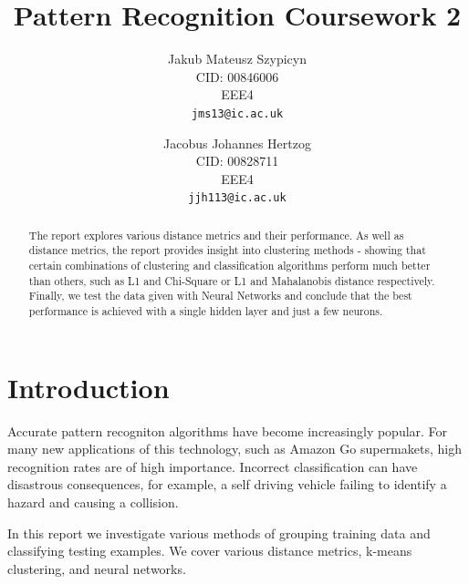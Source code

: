 \documentclass[10pt,twocolumn,letterpaper]{article}
\begin{document}
\title{Pattern Recognition Coursework 2}

\author{Jakub Mateusz Szypicyn\\
CID: 00846006\\
EEE4\\
{\tt\small jms13@ic.ac.uk}
\and
Jacobus Johannes Hertzog\\
CID: 00828711\\
EEE4\\
{\tt\small jjh113@ic.ac.uk}
}

\maketitle

\begin{abstract}
The report explores various distance metrics and their performance. As well as distance metrics, the report provides insight into clustering methods - showing that certain combinations of clustering and classification algorithms perform much better than others, such as L1 and Chi-Square or L1 and Mahalanobis distance respectively. Finally, we test the data given with Neural Networks and conclude that the best performance is achieved with a single hidden layer and just a few neurons.

\end{abstract}
\vspace{-8mm}
\section{Introduction}

Accurate pattern recogniton algorithms have become increasingly popular. For many new applications of this technology, such as Amazon Go supermakets, high recognition rates are of high importance. Incorrect classification can have disastrous consequences, for example, a self driving vehicle failing to identify a hazard and causing a collision.

In this report we investigate various methods of grouping training data and classifying testing examples. We cover various distance metrics, k-means clustering, and neural networks.
\end{document}
